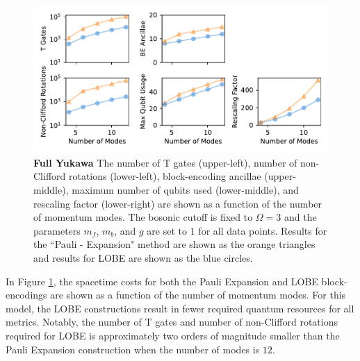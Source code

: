 \begin{figure}
    \label{fig:full-yukawa}
    \includegraphics[width = 16cm]{figures/full-yukawa-resolution-3.pdf}
    \caption{
        \textbf{Full Yukawa}
        The number of T gates (upper-left), number of non-Clifford rotations (lower-left), block-encoding ancillae (upper-middle), maximum number of qubits used (lower-middle), and rescaling factor (lower-right) are shown as a function of the number of momentum modes.
        The bosonic cutoff is fixed to $\Omega = 3$ and the parameters $m_f$, $m_b$, and $g$ are set to $1$ for all data points.
        Results for the ``Pauli - Expansion" method are shown as the orange triangles and results for LOBE are shown as the blue circles.
    }
\end{figure}

In Figure \ref{fig:full-yukawa}, the spacetime costs for both the Pauli Expansion and LOBE block-encodings are shown as a function of the number of momentum modes.
For this model, the LOBE constructions result in fewer required quantum resources for all metrics.
Notably, the number of T gates and number of non-Clifford rotations required for LOBE is approximately two orders of magnitude smaller than the Pauli Expansion construction when the number of modes is $12$.
